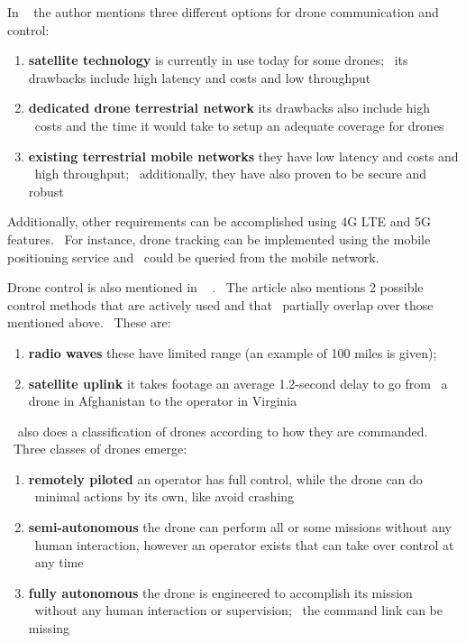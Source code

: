 In ~\cite{ericsson1} the author mentions three different options for drone communication and control:
\begin{enumerate}
    \item \textbf{satellite technology} is currently in use today for some drones; \
            its drawbacks include high latency and costs and low throughput
    \item \textbf{dedicated drone terrestrial network} its drawbacks also include high \
            costs and the time it would take to setup an adequate coverage for drones
    \item \textbf{existing terrestrial mobile networks} they have low latency and costs and \
            high throughput; \
            additionally, they have also proven to be secure and robust
\end{enumerate}

Additionally, other requirements can be accomplished using 4G LTE and 5G features. \
For instance, drone tracking can be implemented using the mobile positioning service and \
could be queried from the mobile network.

Drone control is also mentioned in ~\cite{forbes1} . \
The article also mentions 2 possible control methods that are actively used and that \
partially overlap over those mentioned above. \
These are:
\begin{enumerate}
    \item \textbf{radio waves} these have limited range (an example of 100 miles is given);
    \item \textbf{satellite uplink} it takes footage an average 1.2-second delay to go from \
            a drone in Afghanistan to the operator in Virginia
\end{enumerate}

~\cite{forbes1} also does a classification of drones according to how they are commanded. \
Three classes of drones emerge:
\begin{enumerate}
    \item \textbf{remotely piloted} an operator has full control, while the drone can do \
            minimal actions by its own, like avoid crashing
    \item \textbf{semi-autonomous} the drone can perform all or some missions without any \
            human interaction, however an operator exists that can take over control at \
            any time
    \item \textbf{fully autonomous} the drone is engineered to accomplish its mission \
            without any human interaction or supervision; \
            the command link can be missing
\end{enumerate}


